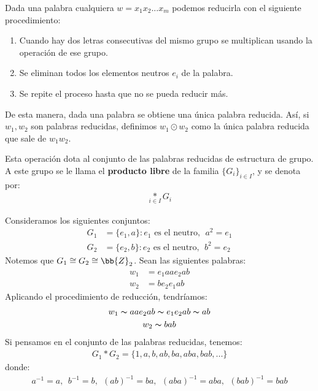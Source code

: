 Dada una palabra cualquiera $w=x_1x_2...x_m$ podemos reducirla con el siguiente procedimiento:
\begin{enumerate}
    \item Cuando hay dos letras consecutivas del mismo grupo se multiplican usando la operación de ese grupo.
    \item Se eliminan todos los elementos neutros $e_i$ de la palabra.
    \item Se repite el proceso hasta que no se pueda reducir más.
\end{enumerate}

De esta manera, dada una palabra se obtiene una única palabra reducida. Así, si $w_1,w_2$ son palabras reducidas, definimos $w_1\odot w_2$ como la única palabra reducida que sale de $w_1w_2$.
\begin{definicion}
    Esta operación dota al conjunto de las palabras reducidas de estructura de grupo. A este grupo se le llama el \textbf{producto libre} de la familia $\{G_i\}_{i\in I}$, y se denota por:
    \begin{gather*}
        \underset{i\in I}{\ast} G_i
    \end{gather*}
\end{definicion}

\begin{ejemplo}
    Consideramos los siguientes conjuntos:
    \begin{align*}
        G_1 &= \{e_1, a\}: e_1 \text{ es el neutro},\ \ a^2 = e_1\\
        G_2 &= \{e_2, b\}: e_2 \text{ es el neutro},\ \ b^2 = e_2
    \end{align*}
    Notemos que $G_1\cong G_2\cong \bb{Z}_2$. Sean las siguientes palabras:
    \begin{align*}
        w_1 &= e_1aae_2ab\\
        w_2 &= be_2e_1ab
    \end{align*}
    Aplicando el procedimiento de reducción, tendríamos:
    \begin{gather*}
        w_1 \thicksim aae_2ab \thicksim e_1e_2ab \thicksim ab\\
        w_2 \thicksim bab
    \end{gather*}
    Si pensamos en el conjunto de las palabras reducidas, tenemos: 
    \begin{gather*}
        G_1 \ast G_2 = \{1, a, b, ab, ba, aba, bab, ...\}
    \end{gather*}
    donde: 
    \begin{gather*}
        a^{-1} = a,\ \ b^{-1}=b,\ \ (ab)^{-1}=ba,\ \ (aba)^{-1}=aba,\ \ (bab)^{-1} = bab
    \end{gather*}
\end{ejemplo}

